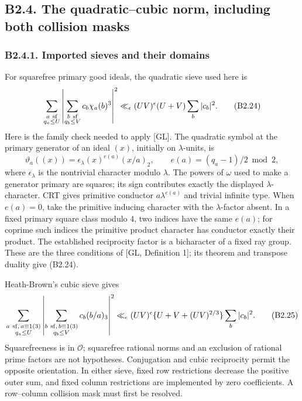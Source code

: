 \documentclass[11pt,a4paper]{article}
\begin{document}
\hypertarget{b2.4.-the-quadraticcubic-norm-including-both-collision-masks}{%
\subsection{B2.4. The quadratic--cubic norm, including both collision
masks}\label{b2.4.-the-quadraticcubic-norm-including-both-collision-masks}}

\hypertarget{b2.4.1.-imported-sieves-and-their-domains}{%
\subsubsection{B2.4.1. Imported sieves and their
domains}\label{b2.4.1.-imported-sieves-and-their-domains}}

For squarefree primary good ideals, the quadratic sieve used here is \[
\sum_{\substack{a\ {\rm sf}\\q_a\le U}}
\left|\sum_{\substack{b\ {\rm sf}\\q_b\le V}}c_b\chi_a(b)^3\right|^2
\ll_\epsilon(UV)^\epsilon(U+V)\sum_b|c_b|^2.
\tag{B2.24}
\] Here is the family check needed to apply {[}GL{]}. The quadratic
symbol at the primary generator of an ideal \((x)\), initially on
\(\lambda\)-units, is \[
\vartheta_a((x))=\epsilon_\lambda(x)^{e(a)}(x/a)_2,\qquad
e(a)=(q_a-1)/2\bmod2,
\] where \(\epsilon_\lambda\) is the nontrivial character modulo
\(\lambda\). The powers of \(\omega\) used to make a generator primary
are squares; its sign contributes exactly the displayed
\(\lambda\)-character. CRT gives primitive conductor \(a\lambda^{e(a)}\)
and trivial infinite type. When \(e(a)=0\), take the primitive inducing
character with the \(\lambda\)-factor absent. In a fixed primary square
class modulo \(4\), two indices have the same \(e(a)\); for coprime such
indices the primitive product character has conductor exactly their
product. The established reciprocity factor is a bicharacter of a fixed
ray group. These are the three conditions of {[}GL, Definition 1{]}; its
theorem and transpose duality give (B2.24).

Heath-Brown's cubic sieve gives \[
\sum_{\substack{a\ {\rm sf},\,a\equiv1(3)\\q_a\le U}}
\left|\sum_{\substack{b\ {\rm sf},\,b\equiv1(3)\\q_b\le V}}
c_b(b/a)_3\right|^2
\ll_\epsilon(UV)^\epsilon
\{U+V+(UV)^{2/3}\}\sum_b|c_b|^2.
\tag{B2.25}
\] Squarefreeness is in \(\mathcal O\); squarefree rational norms and an
exclusion of rational prime factors are not hypotheses. Conjugation and
cubic reciprocity permit the opposite orientation. In either sieve,
fixed row restrictions decrease the positive outer sum, and fixed column
restrictions are implemented by zero coefficients. A row--column
collision mask must first be resolved.
\end{document}
